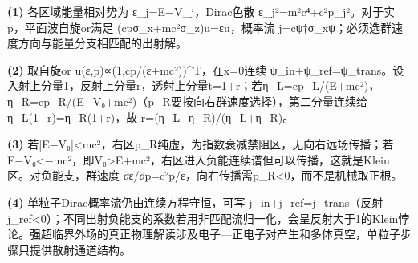 \par\noindent\textbf{(1)} 各区域能量相对势为 ε\_j=E−V\_j，Dirac色散 ε\_j²=m²c⁴+c²p\_j²。对于实p，平面波自旋or满足 (cpσ\_x+mc²σ\_z)u=εu，概率流 j=cψ†σ\_xψ；必须选群速度方向与能量分支相匹配的出射解。
\par\noindent\textbf{(2)} 取自旋or u(ε,p)∝(1,cp/(ε+mc²))\textasciicircum{}T，在x=0连续 ψ\_in+ψ\_ref=ψ\_trans。设入射上分量1，反射上分量r，透射上分量t=1+r；若η\_L=cp\_L/(E+mc²)，η\_R=cp\_R/(E−V₀+mc²)（p\_R要按向右群速度选择），第二分量连续给 η\_L(1−r)=η\_R(1+r)，故 r=(η\_L−η\_R)/(η\_L+η\_R)。
\par\noindent\textbf{(3)} 若|E−V₀|<mc²，右区p\_R纯虚，为指数衰减禁阻区，无向右远场传播；若E−V₀<−mc²，即V₀>E+mc²，右区进入负能连续谱但可以传播，这就是Klein区。对负能支，群速度 ∂ε/∂p=c²p/ε，向右传播需p\_R<0，而不是机械取正根。
\par\noindent\textbf{(4)} 单粒子Dirac概率流仍由连续方程守恒，可写 j\_in+j\_ref=j\_trans（反射j\_ref<0）；不同出射负能支的系数若用非匹配流归一化，会呈反射大于1的Klein悖论。强超临界外场的真正物理解读涉及电子—正电子对产生和多体真空，单粒子步骤只提供散射通道结构。
